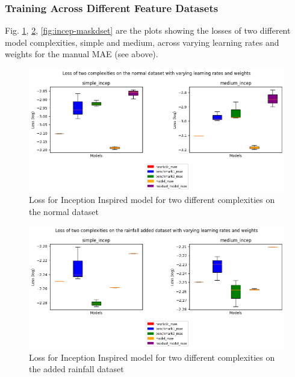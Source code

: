 \subsubsection*{Training Across Different Feature Datasets}
Fig. \ref{fig:incep-normaldset}, \ref{fig:incep-rfdset}, \ref{fig:incep-maskdset} are the plots showing the losses of two different model complexities, simple and medium, across varying learning rates and weights for the manual MAE (see above).
\begin{figure}[tbph]
	\centering
	\includegraphics[width=0.8\linewidth, height=0.3\textheight]{Figures/Results/Inception_model/normal_dataset}
	\caption[Loss for Inception Inspired model for two different complexities on the normal dataset]{Loss for Inception Inspired model for two different complexities on the normal dataset}
	\label{fig:incep-normaldset}
\end{figure}


\begin{figure}[tbph]
	\centering
	\includegraphics[width=0.8\linewidth, height=0.3\textheight]{Figures/Results/Inception_model/rainfall_dataset}
	\caption[Loss for Inception Inspired model for two different complexities on the added rainfall dataset]{Loss for Inception Inspired model for two different complexities on the added rainfall dataset}
	\label{fig:incep-rfdset}
\end{figure}

